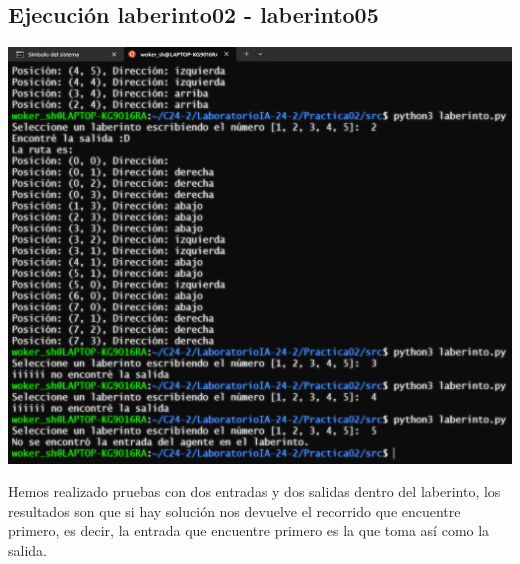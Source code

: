 \documentclass[a4paper,12pt]{article}
\begin{document}
\subsection*{Ejecución laberinto02 - laberinto05}
\begin{center}
    \includegraphics[scale = .5]{IMA/ejecuciones25.png}
\end{center}

Hemos realizado pruebas con dos entradas y dos salidas dentro del laberinto, los resultados son 
que si hay solución nos devuelve el recorrido que encuentre primero, es decir, la entrada que 
encuentre primero es la que toma así como la salida. 

\newpage %
\thispagestyle{fancyref}
\printbibliography %
\end{document}
